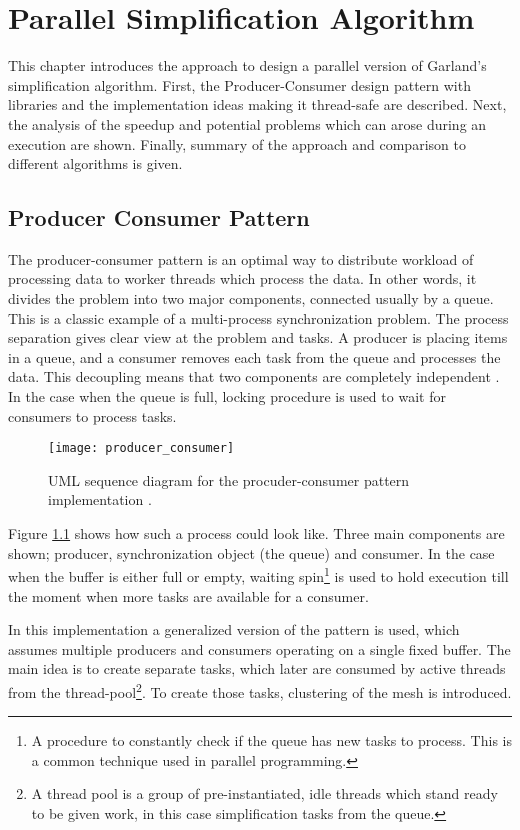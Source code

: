 \chapter{Parallel Simplification Algorithm}

This chapter introduces the approach to design a parallel version of Garland's simplification algorithm. First, the Producer-Consumer design pattern with libraries and the implementation ideas making it thread-safe are described. Next, the analysis of the speedup and potential problems which can arose during an execution are shown. Finally, summary of the approach and comparison to different algorithms is given.

\section{Producer Consumer Pattern}

The producer-consumer pattern is an optimal way to distribute workload of processing data to worker threads which process the data. In other words, it divides the problem into two major components, connected usually by a queue. This is a classic example of a multi-process synchronization problem. The process separation gives clear view at the problem and tasks. A producer is placing items in a queue, and a consumer removes each task from the queue and processes the data. This decoupling means that two components are completely independent \cite{grand02}. In the case when the queue is full, locking procedure is used to wait for consumers to process tasks.

\begin{figure}[H]
  \begin{center}
    \texttt{[image: producer\_consumer]}
    \caption{UML sequence diagram for the procuder-consumer pattern implementation \cite{ropero17}.}
    \label{fig:uml}
  \end{center}
\end{figure}

Figure \ref{fig:uml} shows how such a process could look like. Three main components are shown; producer, synchronization object (the queue) and consumer. In the case when the buffer is either full or empty, waiting spin\footnote{A procedure to constantly check if the queue has new tasks to process. This is a common technique used in parallel programming.} is used to hold execution till the moment when more tasks are available for a consumer.

In this implementation a generalized version of the pattern is used, which assumes multiple producers and consumers operating on a single fixed buffer. The main idea is to create separate tasks, which later are consumed by active threads from the thread-pool\footnote{A thread pool is a group of pre-instantiated, idle threads which stand ready to be given work, in this case simplification tasks from the queue.}. To create those tasks, clustering of the mesh is introduced.

